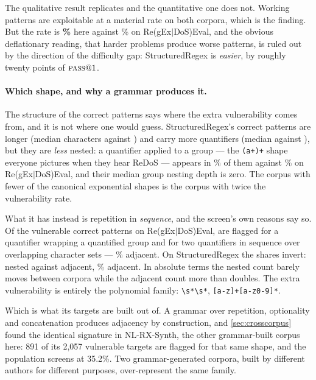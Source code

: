 \documentclass[11pt]{article}
\newcommand{\pass}{\textsc{pass}}
\begin{document}
\begin{table}[htbp]
\centering
\small

\caption{The two reference-independent criteria across both corpora, at
$@1$ in each so the comparison is like for like.}
\label{tab:srcompare}
\end{table}

The qualitative result replicates and the quantitative one does not. Working
patterns are exploitable at a material rate on both corpora, which is the
finding. But the rate is \textbf{\srvulngivencorrect{}\%} here against
\vulngivencorrect{}\% on Re(gEx$|$DoS)Eval, and the obvious deflationary
reading, that harder problems produce worse patterns, is ruled out by the
direction of the difficulty gap: StructuredRegex is \emph{easier}, by roughly
twenty points of $\pass{}@1$.

\paragraph{Which shape, and why a grammar produces it.} The structure of the
correct patterns says where the extra vulnerability comes from, and it is not
where one would guess. StructuredRegex's correct patterns are longer (median
\srlen{} characters against \relen{}) and carry more quantifiers (median
\srquant{} against \requant{}), but they are \emph{less} nested: a quantifier
applied to a group --- the \texttt{(a+)+} shape everyone pictures when they
hear ReDoS --- appears in \srqgrouppct{}\% of them against \reqgrouppct{}\% on
Re(gEx$|$DoS)Eval, and their median group nesting depth is zero. The corpus
with fewer of the canonical exponential shapes is the corpus with twice the
vulnerability rate.

What it has instead is repetition in \emph{sequence}, and the screen's own
reasons say so. Of the vulnerable correct patterns on Re(gEx$|$DoS)Eval,
\renested{} are flagged for a quantifier wrapping a quantified group and
\readjacent{} for two quantifiers in sequence over overlapping character sets
--- \readjacentpct{}\% adjacent. On StructuredRegex the shares invert:
\srnested{} nested against \sradjacent{} adjacent, \sradjacentpct{}\%
adjacent. In absolute terms the nested count barely moves between corpora
while the adjacent count more than doubles. The extra vulnerability is
entirely the polynomial family: \texttt{\textbackslash s*\textbackslash s*},
\texttt{[a-z]+[a-z0-9]*}.

Which is what its targets are built out of. A grammar over repetition,
optionality and concatenation produces adjacency by construction, and
\cref{sec:crosscorpus} found the identical signature in NL-RX-Synth, the
other grammar-built corpus here: 891 of its 2{,}057 vulnerable targets are
flagged for that same shape, and the population screens at 35.2\%. Two
grammar-generated corpora, built by different authors for different purposes,
over-represent the same family.
\end{document}
